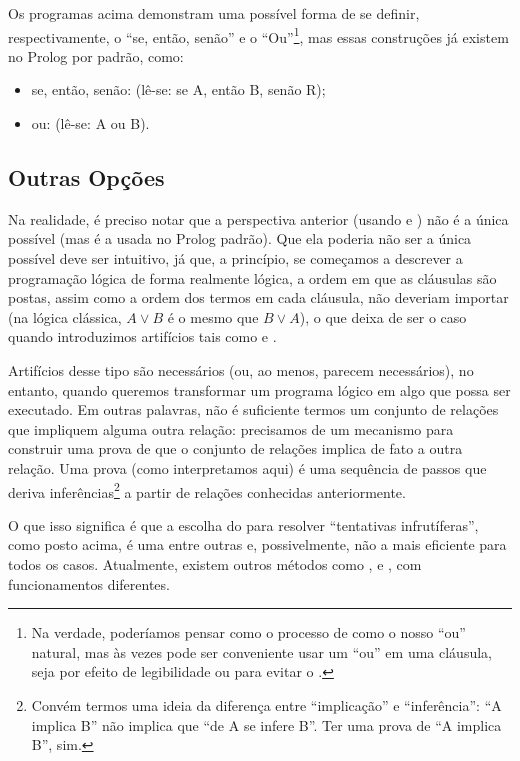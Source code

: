 \documentclass{article}
\begin{document}
Os programas acima demonstram uma possível forma de se definir, respectivamente, o ``se, então, senão'' e o ``Ou''\footnote{Na verdade, poderíamos pensar como o processo de  como o nosso ``ou'' natural, mas às vezes pode ser conveniente usar um ``ou'' em uma cláusula, seja por efeito de legibilidade ou para evitar o .}, mas essas construções já existem no Prolog por padrão, como:

\begin{itemize}
  \item se, então, senão:  (lê-se: se A, então B, senão R);
  \item ou:  (lê-se: A ou B).
\end{itemize}


\subsection{Outras Opções}

Na realidade, é preciso notar que a perspectiva anterior (usando  e
) não é a única possível (mas é a usada no Prolog padrão). Que ela poderia não
ser a única possível deve ser intuitivo, já que, a princípio, se começamos a descrever a programação lógica
de forma realmente lógica, a ordem em que as cláusulas são postas, assim como a ordem dos termos em
cada cláusula, não deveriam importar (na lógica clássica, $A \vee B$ é o mesmo que $B \vee A$), o
que deixa de ser o caso quando introduzimos artifícios tais como  e
.

Artifícios desse tipo são necessários (ou, ao menos, parecem necessários), no entanto, quando
queremos transformar um programa lógico em algo que possa ser executado. Em outras palavras, não é
suficiente termos um conjunto de relações que impliquem alguma outra relação: precisamos de um
mecanismo para construir uma prova de que o conjunto de relações implica de fato a outra relação.
Uma prova (como interpretamos aqui) é uma sequência de passos que deriva inferências\footnote{Convém
  termos uma ideia da diferença entre ``implicação'' e ``inferência'': ``A implica B'' não implica
  que ``de A se infere B''. Ter uma prova de ``A implica B'', sim.} a partir de
relações conhecidas anteriormente.

O que isso significa é que a escolha do  para resolver ``tentativas
infrutíferas'', como posto acima, é uma entre outras e, possivelmente, não a mais eficiente para
todos os casos. Atualmente, existem outros métodos como ,  e , com funcionamentos diferentes.
\end{document}
